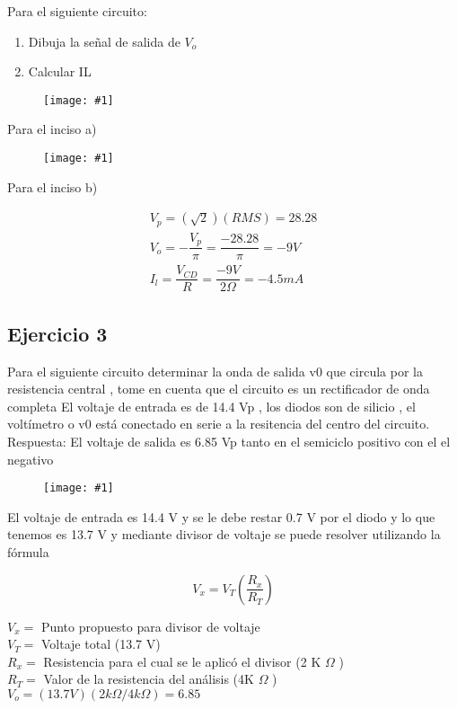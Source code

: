 \documentclass{mylib/reporteCorto}
\newcommand{\insertImage}[2]{
	\begin{figure}[H]
		\centering
		\texttt{[image: \#1]}
	\end{figure}
}
\begin{document}
Para el siguiente circuito:
\begin{enumerate}[label=\Alph*]
	\item Dibuja la señal de salida de $V_o$
	\item Calcular IL
\end{enumerate}

\insertImage{img/dispos_serie2/appdiodo2}{15}

Para el inciso a)

\insertImage{img/dispos_serie2/appdiodo2_a}{8}

Para el inciso b)

\begin{gather*}
	V_p = (\sqrt{2})(RMS) = 28.28 \\
	V_o = - \dfrac{V_p}{\pi} = \dfrac{-28.28}{\pi} = -9 V \\
	I_l = \dfrac{V_{CD}}{R} = \dfrac{-9 V}{2 \Omega} = -4.5 mA
\end{gather*}

\subsection{Ejercicio 3}

Para el siguiente circuito determinar
la onda de salida v0 que circula por la
resistencia central , tome en cuenta
que el circuito es un rectificador de
onda completa
El voltaje de entrada es de 14.4 Vp ,
los diodos son de silicio , el
voltímetro o v0 está conectado en
serie a la resitencia del centro del
circuito.
Respuesta: El voltaje de salida es 6.85
Vp tanto en el semiciclo positivo con
el el negativo

\insertImage{img/dispos_serie2/appdiodo3}{10}

El voltaje de entrada es 14.4 V y se le debe restar 0.7 V por el diodo y lo que tenemos es
13.7 V y mediante divisor de voltaje se puede resolver utilizando la fórmula

$$ V_x = V_T \left(\dfrac{R_x}{R_T}\right)$$

$V_x =$ Punto propuesto para divisor de voltaje\\
$V_T =$ Voltaje total (13.7 V)\\
$R_x =$ Resistencia para el cual se le aplicó el divisor (2 K $\Omega$ )\\
$R_T =$ Valor de la resistencia del análisis (4K $\Omega$ )\\

$V_o = (13.7 V)(2k\Omega / 4k \Omega) = 6.85$\\
\end{document}
